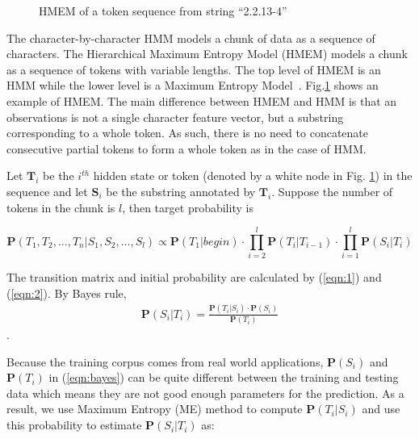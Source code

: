 \begin{figure}[th]
\begin{center}
\end{center}
\caption{HMEM of a token sequence from string ``2.2.13-4''}\label{fig:hmem}
\end{figure}
The character-by-character HMM models a chunk of data as a sequence of
characters. The Hierarchical Maximum Entropy Model (HMEM) models a chunk as
a sequence of tokens with variable lengths.
The top level of HMEM is an HMM while the lower level 
is a Maximum Entropy Model~\cite{Berger96:ME}\cite{megaweb}.
Fig.\ref{fig:hmem} shows an example of HMEM.
The main difference between HMEM and HMM is
that an observations is not a single character feature vector, 
but a substring corresponding to a whole token.
As such, there is no need to concatenate consecutive partial tokens
to form a whole token as in the case of HMM.

Let $\mathbf{T}_i$ be the $i^{th}$ hidden state or token (denoted by
a white node in Fig. \ref{fig:hmem}) in the sequence and
let $\mathbf{S}_i$ be the substring annotated by $\mathbf{T}_i$. 
Suppose the number of tokens in the chunk is $l$, then
target probability is

\begin{equation}
\mathbf{P}(T_1, T_2, ..., T_n|S_1, S_2, ..., S_l)  \propto
\mathbf{P}(T_1|begin) \cdot \prod_{i=2}^{l}{\mathbf{P}(T_i|T_{i-1})}
\cdot \prod_{i=1}^{l}\mathbf{P}(S_i|T_i)
\end{equation}

The transition matrix and initial probability are calculated
by (\ref{eqn:1}) and (\ref{eqn:2}).
By Bayes rule,
\begin{eqnarray} \label{eqn:bayes}
\mathbf{P}(S_i|T_i) = \frac{\mathbf{P}(T_i|S_i) \cdot
\mathbf{P}(S_i)}{\mathbf{P}(T_i)}
\end{eqnarray}.

Because the training corpus comes from real world applications, 
$\mathbf{P}(S_i)$ and $\mathbf{P}(T_i)$ in (\ref{eqn:bayes})
can be quite different between the training and
testing data which means they are not good enough parameters for 
the prediction. As a result, we use Maximum Entropy (ME) method to compute
$\mathbf{P}(T_i|S_i)$ and use this probability to estimate
$\mathbf{P}(S_i|T_i)$ as:

